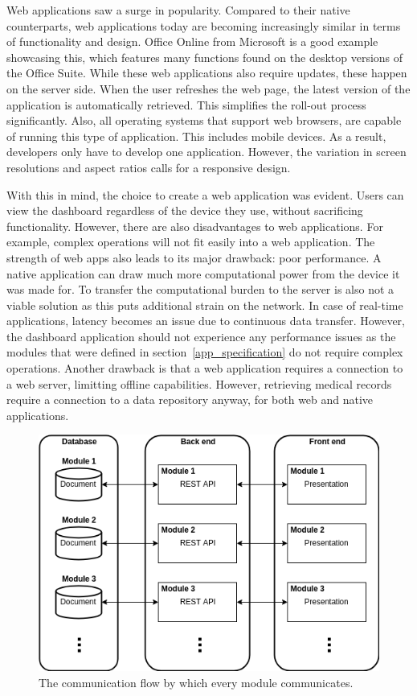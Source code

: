     Web applications saw a surge in popularity. Compared to their native counterparts, web applications today are becoming increasingly similar in terms of functionality and design. Office Online from Microsoft is a good example showcasing this, which features many functions found on the desktop versions of the Office Suite. While these web applications also require updates, these happen on the server side. When the user refreshes the web page, the latest version of the application is automatically retrieved. This simplifies the roll-out process significantly. Also, all operating systems that support web browsers, are capable of running this type of application. This includes mobile devices. As a result, developers only have to develop one application. However, the variation in screen resolutions and aspect ratios calls for a responsive design.

    With this in mind, the choice to create a web application was evident. Users can view the dashboard regardless of the device they use, without sacrificing functionality. However, there are also disadvantages to web applications. For example, complex operations will not fit easily into a web application. The strength of web apps also leads to its major drawback: poor performance. A native application can draw much more computational power from the device it was made for. To transfer the computational burden to the server is also not a viable solution as this puts additional strain on the network. In case of real-time applications, latency becomes an issue due to continuous data transfer. However, the dashboard application should not experience any performance issues as the modules that were defined in section~\ref{app_specification} do not require complex operations. Another drawback is that a web application requires a connection to a web server, limitting offline capabilities. However, retrieving medical records require a connection to a data repository anyway, for both web and native applications.

    \begin{figure}[t]
        \centering
        \includegraphics[width=1\textwidth]{chapters/4_implementation/structure}
        \caption{The communication flow by which every module communicates.}\label{fig:structure}
    \end{figure}

